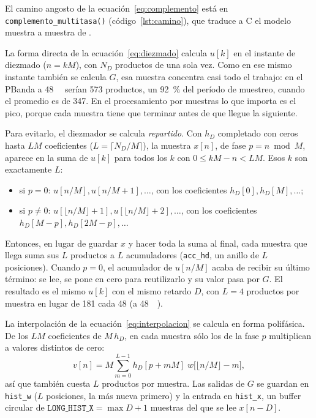 \documentclass[11pt,a4paper]{article}
\begin{document}
El camino angosto de la ecuación~\eqref{eq:complemento} está en
\texttt{complemento\_multitasa()} (código~\ref{lst:camino}), que traduce a C
el modelo muestra a muestra de .

La forma directa de la ecuación~\eqref{eq:diezmado} calcula $u[k]$ en el
instante de diezmado ($n = kM$), con $N_D$ productos de una sola vez. Como
en ese mismo instante también se calcula $G$, esa muestra concentra casi
todo el trabajo: en el PBanda a \qty{48}{\kilo\sps} serían 573 productos, un
\qty{92}{\percent} del período de muestreo, cuando el promedio es de 347. En
el procesamiento por muestras lo que importa es el pico, porque cada muestra
tiene que terminar antes de que llegue la siguiente.

Para evitarlo, el diezmador se calcula \emph{repartido}. Con $h_D$
completado con ceros hasta $LM$ coeficientes ($L = \lceil N_D/M \rceil$),
la muestra $x[n]$, de fase $p = n \bmod M$, aparece en la suma de $u[k]$
para todos los $k$ con $0 \le kM - n < LM$. Esos $k$ son exactamente $L$:
\begin{itemize}[nosep]
  \item si $p = 0$: $u[n/M], u[n/M+1], \dots$, con los coeficientes
        $h_D[0], h_D[M], \dots$;
  \item si $p \ne 0$: $u[\lfloor n/M \rfloor + 1], u[\lfloor n/M \rfloor +
        2], \dots$, con los coeficientes $h_D[M-p], h_D[2M-p], \dots$
\end{itemize}
Entonces, en lugar de guardar $x$ y hacer toda la suma al final, cada
muestra que llega suma sus $L$ productos a $L$ acumuladores
(\texttt{acc\_hd}, un anillo de $L$ posiciones). Cuando $p = 0$, el
acumulador de $u[n/M]$ acaba de recibir su último término: se lee, se pone
en cero para reutilizarlo y su valor pasa por $G$. El resultado es el mismo
$u[k]$ con el mismo retardo $D$, con $L = 4$ productos por muestra en lugar
de 181 cada 48 (a \qty{48}{\kilo\sps}).

La interpolación de la ecuación~\eqref{eq:interpolacion} se calcula en forma
polifásica. De los $LM$ coeficientes de $M\,h_D$, en cada muestra sólo los
de la fase $p$ multiplican a valores distintos de cero:
\begin{equation}
  v[n] = M \sum_{m=0}^{L-1} h_D[p + mM]\; w\bigl[\lfloor n/M \rfloor - m\bigr],
\end{equation}
así que también cuesta $L$ productos por muestra. Las salidas de $G$ se
guardan en \texttt{hist\_w} ($L$ posiciones, la más nueva primero) y la
entrada en \texttt{hist\_x}, un buffer circular de
$\texttt{LONG\_HIST\_X} = \max D + 1$ muestras del que se lee $x[n-D]$.
\end{document}
